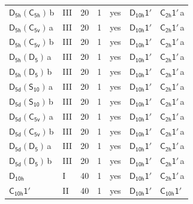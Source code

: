 \documentclass[10pt,a4paper]{article}
\numberwithin{equation}{section}
\newcommand{\grp}[1]{\mathsf{#1}}
\newcommand{\clsletter}[1]{\,{\scriptsize\color{black!55}#1}}
\begin{document}
{\begin{longtable}{@{}llrrlll@{}}
\href{D5h-C5h.pdf}{$\grp{D_{5h}}(\grp{C_{5h}})$}\clsletter{b} & III & 20 & 1 & yes & \href{D10h-1p.pdf}{$\grp{D_{10h}1'}$} & \href{C2h-1p.pdf}{$\grp{C_{2h}1'}$}\clsletter{a}\\
\href{D5h-C5v.pdf}{$\grp{D_{5h}}(\grp{C_{5v}})$}\clsletter{a} & III & 20 & 1 & yes & \href{D10h-1p.pdf}{$\grp{D_{10h}1'}$} & \href{C2h-1p.pdf}{$\grp{C_{2h}1'}$}\clsletter{a}\\
\href{D5h-C5v.pdf}{$\grp{D_{5h}}(\grp{C_{5v}})$}\clsletter{b} & III & 20 & 1 & yes & \href{D10h-1p.pdf}{$\grp{D_{10h}1'}$} & \href{C2h-1p.pdf}{$\grp{C_{2h}1'}$}\clsletter{a}\\
\href{D5h-D5.pdf}{$\grp{D_{5h}}(\grp{D_{5}})$}\clsletter{a} & III & 20 & 1 & yes & \href{D10h-1p.pdf}{$\grp{D_{10h}1'}$} & \href{C2h-1p.pdf}{$\grp{C_{2h}1'}$}\clsletter{a}\\
\href{D5h-D5.pdf}{$\grp{D_{5h}}(\grp{D_{5}})$}\clsletter{b} & III & 20 & 1 & yes & \href{D10h-1p.pdf}{$\grp{D_{10h}1'}$} & \href{C2h-1p.pdf}{$\grp{C_{2h}1'}$}\clsletter{a}\\
\href{D5d-S10.pdf}{$\grp{D_{5d}}(\grp{S_{10}})$}\clsletter{a} & III & 20 & 1 & yes & \href{D10h-1p.pdf}{$\grp{D_{10h}1'}$} & \href{C2h-1p.pdf}{$\grp{C_{2h}1'}$}\clsletter{a}\\
\href{D5d-S10.pdf}{$\grp{D_{5d}}(\grp{S_{10}})$}\clsletter{b} & III & 20 & 1 & yes & \href{D10h-1p.pdf}{$\grp{D_{10h}1'}$} & \href{C2h-1p.pdf}{$\grp{C_{2h}1'}$}\clsletter{a}\\
\href{D5d-C5v.pdf}{$\grp{D_{5d}}(\grp{C_{5v}})$}\clsletter{a} & III & 20 & 1 & yes & \href{D10h-1p.pdf}{$\grp{D_{10h}1'}$} & \href{C2h-1p.pdf}{$\grp{C_{2h}1'}$}\clsletter{a}\\
\href{D5d-C5v.pdf}{$\grp{D_{5d}}(\grp{C_{5v}})$}\clsletter{b} & III & 20 & 1 & yes & \href{D10h-1p.pdf}{$\grp{D_{10h}1'}$} & \href{C2h-1p.pdf}{$\grp{C_{2h}1'}$}\clsletter{a}\\
\href{D5d-D5.pdf}{$\grp{D_{5d}}(\grp{D_{5}})$}\clsletter{a} & III & 20 & 1 & yes & \href{D10h-1p.pdf}{$\grp{D_{10h}1'}$} & \href{C2h-1p.pdf}{$\grp{C_{2h}1'}$}\clsletter{a}\\
\href{D5d-D5.pdf}{$\grp{D_{5d}}(\grp{D_{5}})$}\clsletter{b} & III & 20 & 1 & yes & \href{D10h-1p.pdf}{$\grp{D_{10h}1'}$} & \href{C2h-1p.pdf}{$\grp{C_{2h}1'}$}\clsletter{a}\\
\href{../../../rotation/data/pdf/D10h.pdf}{$\grp{D_{10h}}$} & I & 40 & 1 & yes & \href{D10h-1p.pdf}{$\grp{D_{10h}1'}$} & \href{C2h-1p.pdf}{$\grp{C_{2h}1'}$}\clsletter{a}\\
\href{C10h-1p.pdf}{$\grp{C_{10h}1'}$} & II & 40 & 1 & yes & \href{D10h-1p.pdf}{$\grp{D_{10h}1'}$} & \href{C10h-1p.pdf}{$\grp{C_{10h}1'}$}\\

\end{longtable}}
\end{document}
